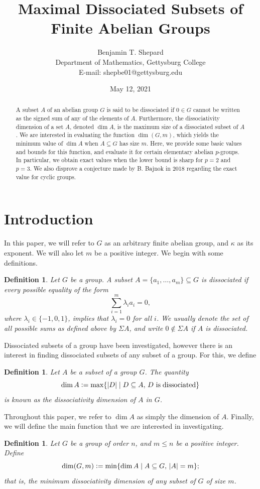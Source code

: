 \documentclass[11pt]{article}
\title{Maximal Dissociated Subsets of Finite Abelian Groups}
\author{Benjamin T. Shepard \\[.1in] Department of Mathematics, Gettysburg College \\E-mail: shepbe01@gettysburg.edu}
\date{May 12, 2021}
\newtheorem{defin}[thm]{Definition}
\begin{document}
\maketitle

\begin{abstract}
    A subset $A$ of an abelian group $G$ is said to be dissociated if $0\in G$ cannot be written as the signed sum of any of the elements of $A$. Furthermore, the dissociativity dimension of a set $A$, denoted $\dim A$, is the maximum size of a dissociated subset of $A$. We are interested in evaluating the function $\dim(G, m)$, which yields the minimum value of $\dim A$ when $A\subseteq G$ has size $m$. Here, we provide some basic values and bounds for this function, and evaluate it for certain elementary abelian $p$-groups. In particular, we obtain exact values when the lower bound is sharp for $p=2$ and $p=3$. We also disprove a conjecture made by B. Bajnok in 2018 regarding the exact value for cyclic groups.
\end{abstract}

\section{Introduction}
In this paper, we will refer to $G$ as an arbitrary finite abelian group, and $\kappa$ as its exponent. We will also let $m$ be a positive integer. We begin with some definitions.

\begin{defin}
Let $G$ be a group. A subset $A=\{a_1,\ldots,a_m\}\subseteq G$ is dissociated if every possible equality of the form
\[\sum_{i=1}^m \lambda_i a_i = 0,\]
where $\lambda_i\in\{-1,0,1\}$, implies that $\lambda_i=0$ for all $i$. We usually denote the set of all possible sums as defined above by $\Sigma A$, and write $0\notin\Sigma A$ if $A$ is dissociated.
\end{defin}

Dissociated subsets of a group have been investigated, however there is an interest in finding dissociated subsets of any subset of a group. For this, we define
\begin{defin}
Let $A$ be a subset of a group $G$. The quantity
    \[\dim A \vcentcolon= \max\{|D|\mid D \subseteq A,\, D \operatorname{\,is\; dissociated}\}\]
    is known as the dissociativity dimension of $A$ in $G$.
\end{defin}

Throughout this paper, we refer to $\dim A$ as simply the dimension of $A$. Finally, we will define the main function that we are interested in investigating.
\begin{defin}
Let $G$ be a group of order $n$, and $m\leq n$ be a positive integer. Define
    \[\dim(G,m)\vcentcolon=\min \{\dim A\mid A \subseteq G,\, |A|=m\};\]
    that is, the minimum dissociativity dimension of any subset of $G$ of size $m$.
\end{defin}
\end{document}
